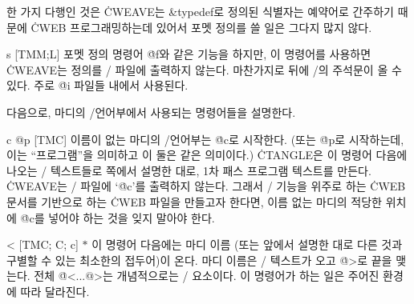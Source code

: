 \more 한 가지 다행인 것은 \.{CWEAVE}는 \&{typedef}로 정의된 식별자는
예약어로 간주하기 때문에 \.{CWEB} 프로그래밍하는데 있어서
포멧 정의를 쓸 일은 그다지 많지 않다.  

\@{s} [TM\to M;\;L] 포멧 정의 명령어 \.{@f}와 같은 기능을 하지만, 이 명령어를
사용하면 \.{CWEAVE}는 정의를 \TEX/ 파일에 출력하지 않는다. 마찬가지로 뒤에 \CEE/의
주석문이 올 수 있다. 주로 \.{@i} 파일들 내에서 사용된다.

\subsec
다음으로, 마디의 \CEE/언어부에서 사용되는 명령어들을 설명한다.

\@{c @p} [TM\to C] 이름이 없는 마디의 \CEE/언어부는 \.{@c}로
시작한다. (또는 \.{@p}로 시작하는데, 이는 ``프로그램''을 의미하고 이
둘은 같은 의미이다.) \.{CTANGLE}은 이 명령어 다음에 나오는 \CEE/
텍스트들로 \tangref 쪽에서 설명한 대로, 1차 패스 프로그램 텍스트를
만든다. \.{CWEAVE}는 \TEX/ 파일에 `\.{@c}'를 출력하지
않는다. 그래서 \TEX/ 기능을 위주로 하는 \.{CWEB}문서를 기반으로
하는 \.{CWEB} 파일을 만들고자 한다면, 이름 없는 마디의 적당한
위치에 \.{@c}를 넣어야 하는 것을 잊지 말아야 한다.

\@< [TM\to C;\; C;\; c] $*$ 이 명령어 다음에는 마디 이름 (또는 앞에서
설명한 대로 다른 것과 구별할 수 있는 최소한의 접두어)이 온다. 마디
이름은 \TEX/ 텍스트가 오고 \.{@>}로 끝을 맺는다. 전체 \.{@<...@>}는
개념적으로는 \CEE/ 요소이다. 이 명령어가 하는 일은 주어진 환경에 따라
달라진다. 

